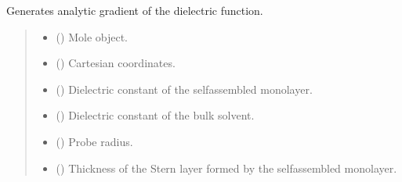 \documentclass[letterpaper,10pt,english]{sphinxmanual}
\begin{document}
\begin{fulllineitems}
\begin{fulllineitems}
\label{\detokenize{fcdft.solvent:fcdft.solvent.pbe.PBE.make_grad_eps}}
\pysigstartsignatures
\pysiglinewithargsret
{}
{\sphinxparamcomma {}\sphinxparamcomma {}\sphinxparamcomma {}\sphinxparamcomma {}\sphinxparamcomma {}\sphinxparamcomma {}\sphinxparamcomma {}\sphinxparamcomma {}\sphinxparamcomma {}}
{}
\pysigstopsignatures
\sphinxAtStartPar
Generates analytic gradient of the dielectric function.
\begin{quote}\begin{description}
\begin{itemize}
\item {} 
\sphinxAtStartPar
{} () \textendash{} Mole object.

\item {} 
\sphinxAtStartPar
{} () \textendash{} Cartesian coordinates.

\item {} 
\sphinxAtStartPar
{} () \textendash{} Dielectric constant of the self\sphinxhyphen{}assembled monolayer.

\item {} 
\sphinxAtStartPar
{} () \textendash{} Dielectric constant of the bulk solvent.

\item {} 
\sphinxAtStartPar
{} () \textendash{} Probe radius.

\item {} 
\sphinxAtStartPar
{} () \textendash{} Thickness of the Stern layer formed by the self\sphinxhyphen{}assembled monolayer.


\end{itemize}
\end{description}
\end{quote}
\end{fulllineitems}
\end{fulllineitems}
\end{document}
